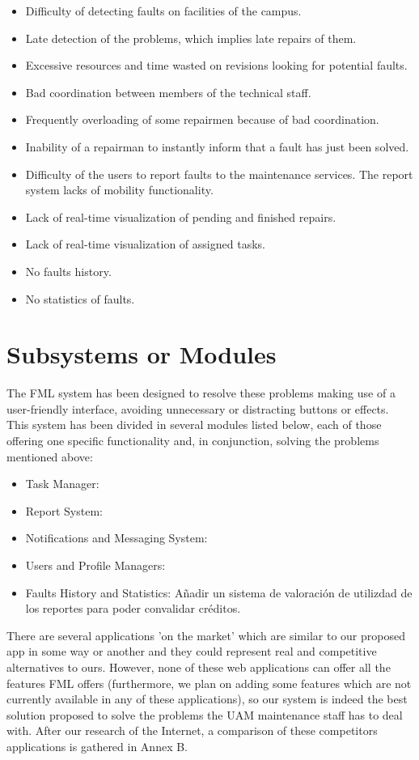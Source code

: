 \documentclass{report}
\begin{document}
\begin{itemize}
\item Difficulty of detecting faults on facilities of the campus.
\item Late detection of the problems, which implies late repairs of them.
\item Excessive resources and time wasted on revisions looking for potential faults.
\item Bad coordination between members of the technical staff.
\item Frequently overloading of some repairmen because of bad coordination.
\item Inability of a repairman to instantly inform that a fault has just been solved.
\item Difficulty of the users to report faults to the maintenance services.
The report system lacks of mobility functionality.
\item Lack of real-time visualization of pending and finished repairs.
\item Lack of real-time visualization of assigned tasks.
\item No faults history.
\item No statistics of faults.
\end{itemize}

\section{Subsystems or Modules}

The FML system has been designed to resolve these problems making use of a user-friendly interface, avoiding unnecessary or distracting buttons or effects. This system has been divided in several modules listed below, each of those offering one specific functionality and, in conjunction, solving the problems mentioned above:
\begin{itemize}
\item Task Manager:
\item Report System: 
\item Notifications and Messaging System:
\item Users and Profile Managers:
\item Faults History and Statistics: Añadir un sistema de valoración de utilizdad de los reportes para poder convalidar créditos.
\end{itemize}

There are several applications 'on the market' which are similar to our proposed app in some way or another and they could represent real and competitive alternatives to ours. However, none of these web applications can offer all the features FML offers (furthermore, we plan on adding some features which are not currently available in any of these applications), so our system is indeed the best solution proposed to solve the problems the UAM maintenance staff has to deal with. After our research of the Internet, a comparison of these competitors applications is gathered in Annex B.
\end{document}
